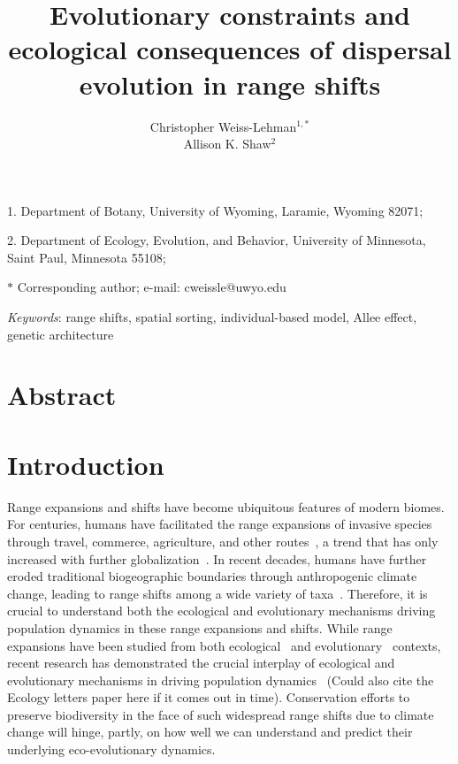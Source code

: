\documentclass[11pt]{article}
\title{Evolutionary constraints and ecological consequences of dispersal evolution in range shifts}
\author{Christopher Weiss-Lehman$^{1,\ast}$ \\ 
Allison K. Shaw$^{2}$}
\date{}
\begin{document}
\maketitle

\noindent{} 1. Department of Botany, University of Wyoming, Laramie, Wyoming 82071;

\noindent{} 2. Department of Ecology, Evolution, and Behavior, University of Minnesota, Saint Paul, Minnesota 55108;

\noindent{} $\ast$ Corresponding author; e-mail: cweissle@uwyo.edu

\bigskip

\textit{Keywords}: range shifts, spatial sorting, individual-based model, Allee effect, genetic architecture


\linenumbers{}
\modulolinenumbers[3]

\newpage{}

\section*{Abstract}
\newpage{}

\section*{Introduction}
Range expansions and shifts have become ubiquitous features of modern biomes. For centuries, humans have facilitated the range expansions of invasive species through travel, commerce, agriculture, and other routes~\citep{elton1958ecology}, a trend that has only increased with further globalization~\citep{hulme2009trade}. In recent decades, humans have further eroded traditional biogeographic boundaries through anthropogenic climate change, leading to range shifts among a wide variety of taxa~\citep{parmesan2006ecological}. Therefore, it is crucial to understand both the ecological and evolutionary mechanisms driving population dynamics in these range expansions and shifts. While range expansions have been studied from both ecological~\citep{skellam1951random} and evolutionary~\citep{fisher1937wave} contexts, recent research has demonstrated the crucial interplay of ecological and evolutionary mechanisms in driving population dynamics~\citep{shaw2015dispersal, weiss2017rapid, ochocki2017rapid, williams2016rapid} (Could also cite the Ecology letters paper here if it comes out in time). Conservation efforts to preserve biodiversity in the face of such widespread range shifts due to climate change will hinge, partly, on how well we can understand and predict their underlying eco-evolutionary dynamics.
\end{document}
